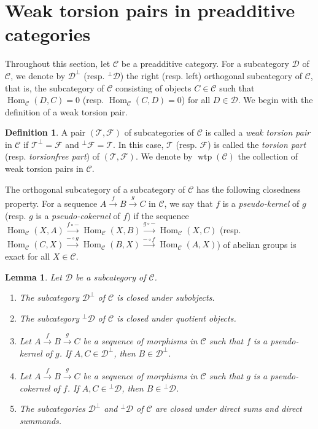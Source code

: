 \documentclass{amsart}
\newtheorem{lem}[thm]{Lemma}
\theoremstyle{definition}
\newtheorem{dfn}[thm]{Definition}
\theoremstyle{remark}
\def\C{\mathcal{C}}
\def\D{\mathcal{D}}
\def\F{\mathcal{F}}
\def\Hom{\operatorname{Hom}}
\def\T{\mathcal{T}}
\def\wtp{\operatorname{wtp}}
\begin{document}
\section{Weak torsion pairs in preadditive categories}

Throughout this section, let $\C$ be a preadditive category. For a subcategory $\D$ of $\C$, we denote by $\D^\perp$ (resp. $^\perp\D$) the right (resp. left) orthogonal subcategory of $\C$, that is, the subcategory of $\C$ consisting of objects $C\in\C$ such that $\Hom_\C(D,C)=0$ (resp. $\Hom_\C(C,D)=0$) for all $D\in\D$. We begin with the definition of a weak torsion pair.

\begin{dfn}
A pair $(\T,\F)$ of subcategories of $\C$ is called a {\em weak torsion pair} in $\C$ if $\T^\perp=\F$ and $^\perp\F=\T$. In this case, $\T$ (resp. $\F$) is called the {\em torsion part} (resp. {\em torsionfree part}) of $(\T,\F)$. We denote by $\wtp(\C)$ the collection of weak torsion pairs in $\C$.
\end{dfn}

The orthogonal subcategory of a subcategory of $\C$ has the following closedness property. For a sequence $A\overset{f}\to B\overset{g}\to C$ in $\C$, we say that $f$ is a {\em pseudo-kernel} of $g$ (resp. $g$ is a {\em pseudo-cokernel} of $f$) if the sequence $\Hom_\C(X,A)\overset{f\circ-}\to\Hom_\C(X,B)\overset{g\circ-}\to\Hom_\C(X,C)$ (resp. $\Hom_\C(C,X)\overset{-\circ g}\to\Hom_\C(B,X)\overset{-\circ f}\to\Hom_\C(A,X)$) of abelian groups is exact for all $X\in\C$.

\begin{lem}\label{lem closed under}
Let $\D$ be a subcategory of $\C$.
\begin{enumerate}[\rm(1)]
\item 
The subcategory $\D^\perp$ of $\C$ is closed under subobjects.
\item 
The subcategory $^\perp\D$ of $\C$ is closed under quotient objects.
\item 
Let $A\overset{f}\to B\overset{g}\to C$ be a sequence of morphisms in $\C$ such that $f$ is a pseudo-kernel of $g$. If $A,C\in\D^\perp$, then $B\in\D^\perp$.
\item 
Let $A\overset{f}\to B\overset{g}\to C$ be a sequence of morphisms in $\C$ such that $g$ is a pseudo-cokernel of $f$. If $A,C\in{}^\perp\D$, then $B\in{}^\perp\D$.
\item 
The subcategories $\D^\perp$ and $^\perp\D$ of $\C$ are closed under direct sums and direct summands.
\end{enumerate}
\end{lem}
\end{document}
